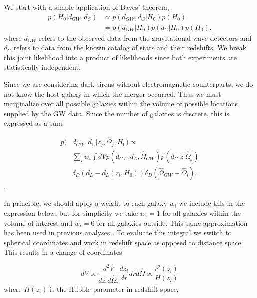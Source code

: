 
We start with a simple application of Bayes' theorem,
\begin{align}
    p(H_0|d_{GW}, d_C)&\propto p(d_{GW}, d_C|H_0)p(H_0)\nonumber\\
    &= p(d_{GW}|H_0)p(d_C|H_0)p(H_0).
\label{eq:bayes}
\end{align}
where $d_{GW}$ refers to the observed data from the gravitational wave detectors and $d_C$ refers to data from the known catalog of stars and their redshifts. We break this joint likelihood into a product of likelihoods since both experiments are statistically independent.

Since we are considering dark sirens without electromagnetic counterparts, we do not know the host galaxy in which the merger occurred. Thus we must marginalize over all possible galaxies within the volume of possible locations supplied by the GW data. Since the number of galaxies is discrete, this is expressed as a sum:

\begin{align}
    p(&d_{GW}, d_C|{z_j, \hat{\Omega}_j},H_0)  \propto  \nonumber\\
    &\sum_{i} w_i \int dV p(d_{GW}|d_L, \hat{\Omega}_{GW}) 
    p(d_C|{z_, \hat{\Omega}_j}) \nonumber\\
    & \delta_D (d_L - d_L(z_i, H_0)) \delta_D (\hat{\Omega}_{GW} - \hat{\Omega}_i).
    \label{eq:marginal_like}
\end{align}.

In principle, we should apply a weight to each galaxy $w_i$ we include this in the expression below, but for simplicity we take $w_i=1$ for all galaxies within the volume of interest and $w_i=0$ for all galaxies outside. This same approximation has been used in previous analyses \cite{Chen_2018,GW170814_DES,Nair_2018}. To evaluate this integral we switch to spherical coordinates and work in redshift space as opposed to distance space. This results in a change of coordinates

\begin{equation}
dV \propto \frac{d^2 V}{d z_i d\hat{\Omega}_i} \frac{d z_i}{d r} d r d\hat{\Omega} \propto \frac{r^2(z_i)}{H(z_i)}
\end{equation}
where $H(z_i)$ is the Hubble parameter in redshift space,

